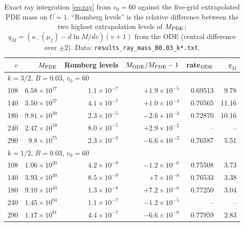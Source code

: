 \documentclass[11pt]{article}
\begin{document}
\begin{table}[t]
\centering\small
\begin{tabular}{rrrrrr}
\toprule
$v$ & $M_{\rm PDE}$ & Romberg levels & $M_{\rm ODE}/M_{\rm PDE}-1$ & rate$_{\rm ODE}$ & $q_M$\\
\midrule
\multicolumn{6}{l}{$k=3/2$, $B=0.03$, $v_0=60$}\\
108 & $6.58\times10^{17}$ & $1.1\times10^{-7}$ & $+1.9\times10^{-5}$ & 0.69513 & 9.78\\
140 & $3.50\times10^{27}$ & $4.1\times10^{-7}$ & $+1.0\times10^{-4}$ & 0.70565 & 11.16\\
180 & $9.81\times10^{39}$ & $2.3\times10^{-5}$ & $-2.6\times10^{-3}$ & 0.72870 & 10.16\\
240 & $2.47\times10^{59}$ & $8.0\times10^{-5}$ & $+2.9\times10^{-2}$ & -- & --\\
290 & $9.8\times10^{75}$ & $2.3\times10^{-3}$ & $-6.6\times10^{-2}$ & 0.76587 & 5.51\\
\midrule
\multicolumn{6}{l}{$k=1/2$, $B=0.03$, $v_0=60$}\\
108 & $1.06\times10^{20}$ & $4.2\times10^{-9}$ & $-1.2\times10^{-6}$ & 0.75508 & 3.73\\
140 & $3.93\times10^{30}$ & $8.5\times10^{-9}$ & $+7\times10^{-8}$ & 0.76533 & 3.38\\
180 & $9.10\times10^{43}$ & $1.3\times10^{-8}$ & $+7.2\times10^{-6}$ & 0.77250 & 3.04\\
240 & $1.45\times10^{64}$ & $1.1\times10^{-7}$ & $-1.2\times10^{-5}$ & -- & --\\
290 & $1.17\times10^{81}$ & $4.4\times10^{-7}$ & $-6.6\times10^{-6}$ & 0.77959 & 2.83\\
\bottomrule
\end{tabular}
\caption{Exact ray integration \eqref{eq:ray} from $v_0=60$ against the five-grid extrapolated PDE mass on $U=1$. ``Romberg levels'' is the relative difference between the two highest extrapolation levels of $M_{\rm PDE}$; $q_M=(\kappa_-(\mu_f)-d\ln M/dv)(v+1)$ from the ODE (central difference over $\pm2$). Data: \texttt{results\_ray\_mass\_B0.03\_k*.txt}.}
\label{tab:ray}
\end{table}
\end{document}
